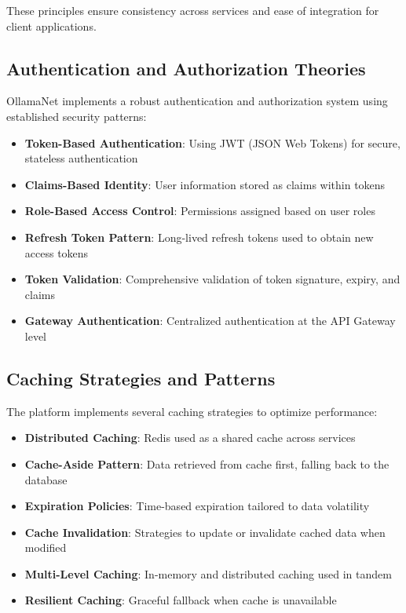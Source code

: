 These principles ensure consistency across services and ease of integration for client applications.

\subsection{Authentication and Authorization Theories}

OllamaNet implements a robust authentication and authorization system using established security patterns:

\begin{itemize}
    \item \textbf{Token-Based Authentication}: Using JWT (JSON Web Tokens) for secure, stateless authentication
    \item \textbf{Claims-Based Identity}: User information stored as claims within tokens
    \item \textbf{Role-Based Access Control}: Permissions assigned based on user roles
    \item \textbf{Refresh Token Pattern}: Long-lived refresh tokens used to obtain new access tokens
    \item \textbf{Token Validation}: Comprehensive validation of token signature, expiry, and claims
    \item \textbf{Gateway Authentication}: Centralized authentication at the API Gateway level
\end{itemize}

\subsection{Caching Strategies and Patterns}

The platform implements several caching strategies to optimize performance:

\begin{itemize}
    \item \textbf{Distributed Caching}: Redis used as a shared cache across services
    \item \textbf{Cache-Aside Pattern}: Data retrieved from cache first, falling back to the database
    \item \textbf{Expiration Policies}: Time-based expiration tailored to data volatility
    \item \textbf{Cache Invalidation}: Strategies to update or invalidate cached data when modified
    \item \textbf{Multi-Level Caching}: In-memory and distributed caching used in tandem
    \item \textbf{Resilient Caching}: Graceful fallback when cache is unavailable
\end{itemize}

